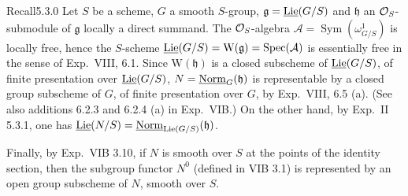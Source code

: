 \begin{enoncerm}{Recall}{5.3.0}\label{XXII.5.3.0}
{\renewcommand{\thefootnote}{(29)}}%
Let $S$ be a scheme, $G$ a smooth $S$-group, $\mathfrak g=\underline{\operatorname{Lie}}(G/S)$ and $\mathfrak h$ an $\mathcal{O}_S$-submodule of $\mathfrak g$ locally a direct summand. The $\mathcal{O}_S$-algebra $\mathcal A=\operatorname{Sym}(\omega^1_{G/S})$ is locally free, hence the $S$-scheme $\underline{\operatorname{Lie}}(G/S)=\mathrm W(\mathfrak g)=\operatorname{Spec}(\mathcal A)$ is essentially free in the sense of Exp.~VIII, 6.1. Since $\mathrm W(\mathfrak h)$ is a closed subscheme of $\underline{\operatorname{Lie}}(G/S)$, of finite presentation over $\underline{\operatorname{Lie}}(G/S)$, $N=\underline{\mathrm{Norm}}_G(\mathfrak h)$ is representable by a closed group subscheme of $G$, of finite presentation over $G$, by Exp.~VIII, 6.5 (a). (See also additions 6.2.3 and 6.2.4 (a) in Exp.~VIB.) On the other hand, by Exp.~II 5.3.1, one has $\underline{\operatorname{Lie}}(N/S)=\underline{\mathrm{Norm}}_{\operatorname{Lie}(G/S)}(\mathfrak h)$.

Finally, by Exp.~VIB 3.10, if $N$ is smooth over $S$ at the points of the identity section, then the subgroup functor $N^0$ (defined in VIB 3.1) is represented by an open group subscheme of $N$, smooth over $S$.
\end{enoncerm}
